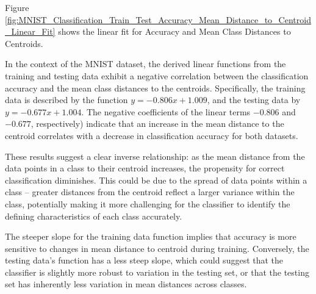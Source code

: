 Figure \ref{fig:MNIST_Classification_Train_Test_Accuracy_Mean_Distance_to_Centroid_Linear_Fit} shows the linear fit for Accuracy and Mean Class Distances to Centroids.

In the context of the MNIST dataset, the derived linear functions from the training and testing data exhibit a negative correlation between the classification accuracy and the mean class distances to the centroids. Specifically, the training data is described by the function $ y = -0.806x + 1.009 $, and the testing data by $ y = -0.677x + 1.004 $. The negative coefficients of the linear terms $ -0.806 $ and $ -0.677 $, respectively) indicate that an increase in the mean distance to the centroid correlates with a decrease in classification accuracy for both datasets.

These results suggest a clear inverse relationship: as the mean distance from the data points in a class to their centroid increases, the propensity for correct classification diminishes. This could be due to the spread of data points within a class – greater distances from the centroid reflect a larger variance within the class, potentially making it more challenging for the classifier to identify the defining characteristics of each class accurately.

The steeper slope for the training data function implies that accuracy is more sensitive to changes in mean distance to centroid during training. Conversely, the testing data's function has a less steep slope, which could suggest that the classifier is slightly more robust to variation in the testing set, or that the testing set has inherently less variation in mean distances across classes.

